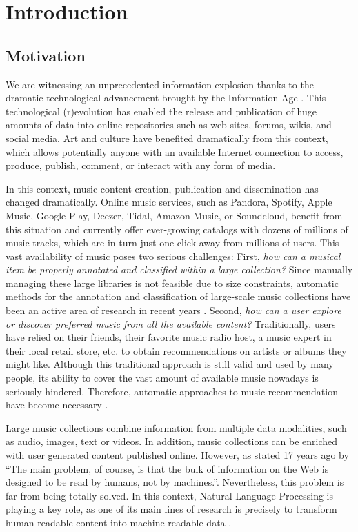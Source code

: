 
\chapter{Introduction}
\label{sec:intro}

\section{Motivation}
\label{sec:intro:motivation}

We are witnessing an unprecedented information explosion thanks to the dramatic technological advancement brought by the Information Age \citep{smith2009social}. This technological (r)evolution has enabled the release and publication of huge amounts of data into online repositories such as web sites, forums, wikis, and social media. Art and culture have benefited dramatically from this context, which allows potentially anyone with an available Internet connection to access, produce, publish, comment, or interact with any form of media. 

In this context, music content creation, publication and dissemination has changed dramatically. Online music services, such as Pandora, Spotify, Apple Music, Google Play, Deezer, Tidal, Amazon Music, or Soundcloud, benefit from this situation and currently offer ever-growing catalogs with dozens of millions of music tracks, which are in turn just one click away from millions of users. This vast availability of music poses two serious challenges: First, \textit{how can a musical item be properly annotated and classified within a large collection?} Since manually managing these large libraries is not feasible due to size constraints, automatic methods for the annotation and classification of large-scale music collections have been an active area of research in recent years \citep{Schedl2014}. Second, \textit{how can a user explore or discover preferred music from all the available content?} Traditionally, users have relied on their friends, their favorite music radio host, a music expert in their local retail store, etc. to obtain recommendations on artists or albums they might like. Although this traditional approach is still valid and used by many people, its ability to cover the vast amount of available music nowadays is seriously hindered. Therefore, automatic approaches to music recommendation have become necessary \citep{celma2008new}.

Large music collections combine information from multiple data modalities, such as audio, images, text or videos. In addition, music collections can be enriched with user generated content published online. However, as stated 17 years ago by \cite{Cohen2000} ``The main problem, of course, is that the bulk of information on the Web is designed to be read by humans, not by machines.''. Nevertheless, this problem is far from being totally solved. In this context, Natural Language Processing is playing a key role, as one of its main lines of research is precisely to transform human readable content into machine readable data \citep{cowie1996information}. 

